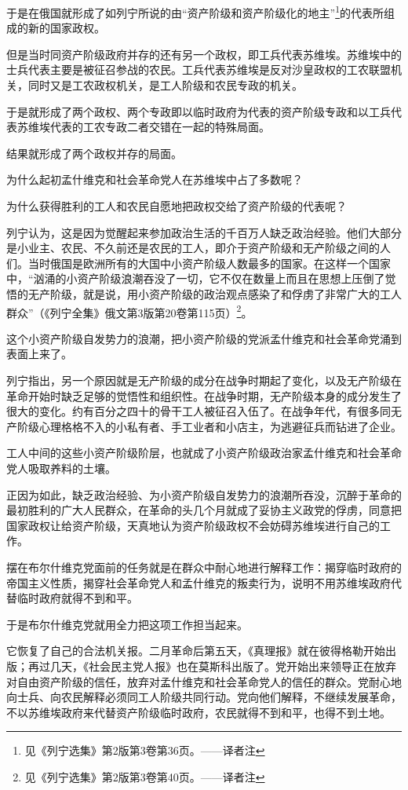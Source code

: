 于是在俄国就形成了如列宁所说的由“资产阶级和资产阶级化的地主”\footnote{见《列宁选集》第2版第3卷第36页。——译者注}的代表所组成的新的国家政权。

但是当时同资产阶级政府并存的还有另一个政权，即工兵代表苏维埃。苏维埃中的士兵代表主要是被征召参战的农民。工兵代表苏维埃是反对沙皇政权的工农联盟机关，同时又是工农政权机关，是工人阶级和农民专政的机关。

于是就形成了两个政权、两个专政即以临时政府为代表的资产阶级专政和以工兵代表苏维埃代表的工农专政二者交错在一起的特殊局面。

结果就形成了两个政权并存的局面。

为什么起初孟什维克和社会革命党人在苏维埃中占了多数呢？

为什么获得胜利的工人和农民自愿地把政权交给了资产阶级的代表呢？

列宁认为，这是因为觉醒起来参加政治生活的千百万人缺乏政治经验。他们大部分是小业主、农民、不久前还是农民的工人，即介于资产阶级和无产阶级之间的人们。当时俄国是欧洲所有的大国中小资产阶级人数最多的国家。在这样一个国家中，“汹涌的小资产阶级浪潮吞没了一切，它不仅在数量上而且在思想上压倒了觉悟的无产阶级，就是说，用小资产阶级的政治观点感染了和俘虏了非常广大的工人群众”（《列宁全集》俄文第3版第20卷第115页）\footnote{见《列宁选集》第2版第3卷第40页。——译者注}。

这个小资产阶级自发势力的浪潮，把小资产阶级的党派孟什维克和社会革命党涌到表面上来了。

列宁指出，另一个原因就是无产阶级的成分在战争时期起了变化，以及无产阶级在革命开始时缺乏足够的觉悟性和组织性。在战争时期，无产阶级本身的成分发生了很大的变化。约有百分之四十的骨干工人被征召入伍了。在战争年代，有很多同无产阶级心理格格不入的小私有者、手工业者和小店主，为逃避征兵而钻进了企业。

工人中间的这些小资产阶级阶层，也就成了小资产阶级政治家孟什维克和社会革命党人吸取养料的土壤。

正因为如此，缺乏政治经验、为小资产阶级自发势力的浪潮所吞没，沉醉于革命的最初胜利的广大人民群众，在革命的头几个月就成了妥协主义政党的俘虏，同意把国家政权让给资产阶级，天真地认为资产阶级政权不会妨碍苏维埃进行自己的工作。

摆在布尔什维克党面前的任务就是在群众中耐心地进行解释工作：揭穿临时政府的帝国主义性质，揭穿社会革命党人和孟什维克的叛卖行为，说明不用苏维埃政府代替临时政府就得不到和平。

于是布尔什维克党就用全力把这项工作担当起来。

它恢复了自己的合法机关报。二月革命后第五天，《真理报》就在彼得格勒开始出版；再过几天，《社会民主党人报》也在莫斯科出版了。党开始出来领导正在放弃对自由资产阶级的信任，放弃对孟什维克和社会革命党人的信任的群众。党耐心地向士兵、向农民解释必须同工人阶级共同行动。党向他们解释，不继续发展革命，不以苏维埃政府来代替资产阶级临时政府，农民就得不到和平，也得不到土地。


